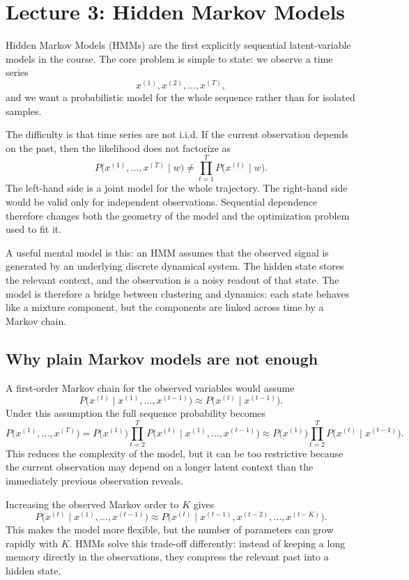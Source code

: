 \section{Lecture 3: Hidden Markov Models}

Hidden Markov Models (HMMs) are the first explicitly sequential latent-variable models in the course. The core problem is simple to state: we observe a time series
\[
  x^{(1)},x^{(2)},\dots,x^{(T)},
\]
and we want a probabilistic model for the whole sequence rather than for isolated samples.

The difficulty is that time series are not i.i.d. If the current observation depends on the past, then the likelihood does not factorize as
\[
  P\bigl(x^{(1)},\dots,x^{(T)}\mid w\bigr)
  \neq
  \prod_{t=1}^{T} P\bigl(x^{(t)}\mid w\bigr).
\]
The left-hand side is a joint model for the whole trajectory. The right-hand side would be valid only for independent observations. Sequential dependence therefore changes both the geometry of the model and the optimization problem used to fit it.

A useful mental model is this: an HMM assumes that the observed signal is generated by an underlying discrete dynamical system. The hidden state stores the relevant context, and the observation is a noisy readout of that state. The model is therefore a bridge between clustering and dynamics: each state behaves like a mixture component, but the components are linked across time by a Markov chain.

\subsection{Why plain Markov models are not enough}

A first-order Markov chain for the observed variables would assume
\[
  P\bigl(x^{(t)}\mid x^{(1)},\dots,x^{(t-1)}\bigr)
  \approx
  P\bigl(x^{(t)}\mid x^{(t-1)}\bigr).
\]
Under this assumption the full sequence probability becomes
\[
  P\bigl(x^{(1)},\dots,x^{(T)}\bigr)
  =
  P\bigl(x^{(1)}\bigr)
  \prod_{t=2}^{T}
  P\bigl(x^{(t)}\mid x^{(1)},\dots,x^{(t-1)}\bigr)
  \approx
  P\bigl(x^{(1)}\bigr)
  \prod_{t=2}^{T}
  P\bigl(x^{(t)}\mid x^{(t-1)}\bigr).
\]
This reduces the complexity of the model, but it can be too restrictive because the current observation may depend on a longer latent context than the immediately previous observation reveals.

Increasing the observed Markov order to $K$ gives
\[
  P\bigl(x^{(t)}\mid x^{(1)},\dots,x^{(t-1)}\bigr)
  \approx
  P\bigl(x^{(t)}\mid x^{(t-1)},x^{(t-2)},\dots,x^{(t-K)}\bigr).
\]
This makes the model more flexible, but the number of parameters can grow rapidly with $K$. HMMs solve this trade-off differently: instead of keeping a long memory directly in the observations, they compress the relevant past into a hidden state.

